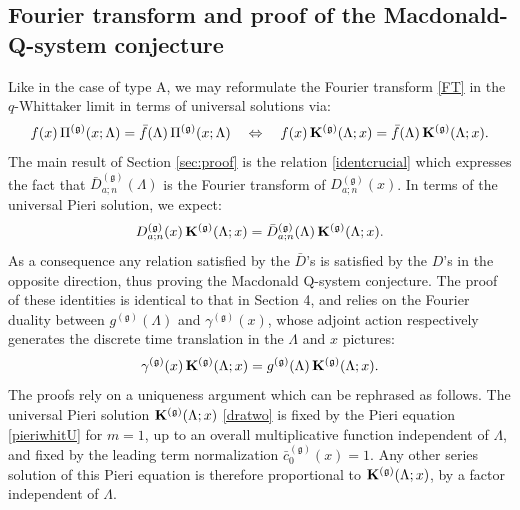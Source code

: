 \documentclass[12pt]{amsart}
\newcommand{\g}{{\mathfrak{g}}}
\newcommand{\lL}{{\Lambda}}
\numberwithin{equation}{section}
\begin{document}
\subsection{Fourier transform and proof of the Macdonald- Q-system conjecture}\label{sec:53}

Like in the case of type A, we may reformulate the Fourier transform \eqref{FT} in the $q$-Whittaker limit in terms of universal solutions via:
$$f(x) \, \Pi^{(\g)}(x;\lL)={\bar f}(\lL)\, \Pi^{(\g)}(x;\lL)\quad \Leftrightarrow \quad f(x) \, {\bf K}^{(\g)}(\lL;x)={\bar f}(\lL)\, {\bf K}^{(\g)}(\lL;x).$$
The main result of Section \ref{sec:proof}  is the relation \eqref{identcrucial} which expresses the fact that $\bar D_{a;n}^{(\g)}(\lL)$ is the Fourier transform of $D_{a;n}^{(\g)}(x)$.
In terms of the universal Pieri solution, we expect:
$$D_{a;n}^{(\g)}(x)\, {\bf K}^{(\g)}(\lL;x)=\bar D_{a;n}^{(\g)}(\lL)\, {\bf K}^{(\g)}(\lL;x).$$
As a consequence any relation satisfied by the $\bar D$'s is satisfied by the $D$'s in the opposite direction, thus proving  the Macdonald Q-system conjecture.
The proof of these identities is identical to that in Section 4, and relies on the Fourier duality between $g^{(\g)}(\lL)$ and $\gamma^{(\g)}(x)$, whose adjoint action respectively generates the discrete time translation in the $\lL$ and $x$ pictures:
$$\gamma^{(\g)}(x)\, {\bf K}^{(\g)}(\lL;x)=g^{(\g)}(\lL)\, {\bf K}^{(\g)}(\lL;x).$$
The proofs rely on a uniqueness argument which can be rephrased as follows. The universal Pieri solution ${\bf K}^{(\g)}(\lL;x)$ \eqref{dratwo} is fixed by the Pieri equation \eqref{pieriwhitU} for $m=1$, up to an overall multiplicative function independent of $\lL$, and fixed by the leading term normalization ${\bar c}_0^{(\g)}(x)=1$.
Any other series solution of this Pieri equation is therefore proportional to ${\bf K}^{(\g)}(\lL;x)$, by a factor independent of $\lL$. 
\end{document}
